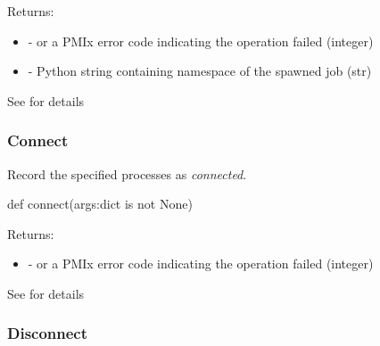Returns:
\begin{itemize}
    \item {} -  or a \ac{PMIx} error code indicating the operation failed (integer)
    \item {} - Python string containing namespace of the spawned job (str)
\end{itemize}

See  for details


\subsubsection{Connect}

\summary

Record the specified processes as \textit{connected}.

\format

\pyspecificstart
\begin{codepar}
def connect(args:dict is not None)
\end{codepar}
\pyspecificend

\begin{arglist}
\end{arglist}

Returns:
\begin{itemize}
    \item {} -  or a \ac{PMIx} error code indicating the operation failed (integer)
\end{itemize}

See  for details


\subsubsection{Disconnect}

\summary


